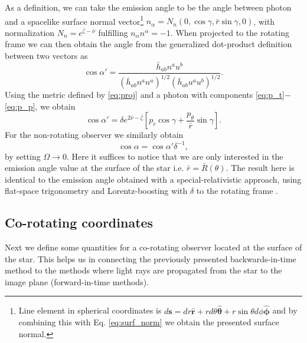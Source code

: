 \documentclass{aa}
\newcommand{\be}{\begin{equation}}
\newcommand{\ee}{\end{equation}}
\renewcommand{\vec}[1]{\ensuremath{\boldsymbol{#1}}}
\newcommand{\refe}[1]{#1}
\newcommand{\refedel}[1]{}
\newcommand{\rb}{\ensuremath{\bar{r}}}
\newcommand{\nub}{\ensuremath{\bar{\nu}}}
\newcommand{\zetab}{\ensuremath{\bar{\zeta}}}
\begin{document}
As a definition, we can take the emission angle to be the angle between photon and a spacelike surface normal vector\footnote{
Line element in spherical coordinates is $d\vec{s} = dr \vec{\hat{r}} + r d\theta \vec{\hat{\theta}} + r \sin\theta d\phi \vec{\hat{\phi}}$ and by combining this with Eq. \eqref{eq:surf_norm} we obtain the presented surface normal.
}
$n_{\alpha} = N_n (0, \cos\gamma, \rb \sin\gamma, 0)$, with normalization $N_n = e^{\zetab - \nub}$ fulfilling $n_{\alpha}n^{\alpha} = -1$.  
When projected to the rotating frame we can then obtain the angle from the generalized dot-product definition between two vectors as
\be\label{eq:gen_angle}
\cos\alpha' = \frac{\bar{h}_{ab}n^a u^b}{(\bar{h}_{ab} n^a n^a)^{1/2} (\bar{h}_{ab} u^a u^b)^{1/2}}.
\ee
Using the metric defined by \eqref{eq:proj} and a photon with components \eqref{eq:p_t}$-$\eqref{eq:p_p}, we obtain
\be\label{eq:cosap}
\cos\alpha' = \delta e^{2\nub-\zetab} \left[ p_{\rb} \cos\gamma + \frac{p_{\theta}}{\rb}\sin\gamma \right].
\ee
For the non-rotating observer we similarly obtain 
\be\label{eq:cosa}
\cos\alpha = \cos\alpha' \delta^{-1},
\ee
\refe{by setting $\Omega \rightarrow 0$}.
Here it suffices to notice that we are only interested in the emission angle value at the surface of the star i.e. $\rb = \bar{R}(\theta)$.
The result here is \refe{identical} to the emission angle obtained with a special-relativistic approach, using flat-space trigonometry and Lorentz-boosting with $\delta$ to the rotating frame \citep[see e.g.,][]{PB06}.



\subsection{Co-rotating coordinates \refedel{frame}}\label{sect:coords}
Next we define some quantities for a co-rotating observer located at the surface of the star.
This helps us in connecting the previously presented backwards-in-time method to the methods where light rays are propagated from the star to the image plane (forward-in-time methods).
\end{document}

